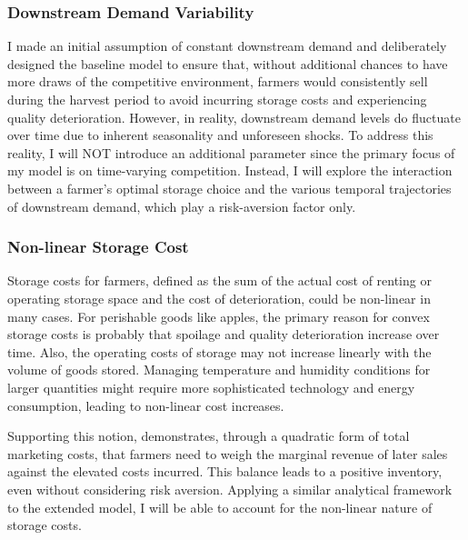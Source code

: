 \subsubsection{Downstream Demand Variability}
\noindent I made an initial assumption of constant downstream demand and deliberately designed the baseline model to ensure that, without additional chances to have more draws of the competitive environment, farmers would consistently sell during the harvest period to avoid incurring storage costs and experiencing quality deterioration. However, in reality, downstream demand levels do fluctuate over time due to inherent seasonality and unforeseen shocks. To address this reality, I will NOT introduce an additional parameter since the primary focus of my model is on time-varying competition. Instead, I will explore the interaction between a farmer's optimal storage choice and the various temporal trajectories of downstream demand, which play a risk-aversion factor only.



\subsubsection{Non-linear Storage Cost}
\noindent Storage costs for farmers, defined as the sum of the actual cost of renting or operating storage space and the cost of deterioration, could be non-linear in many cases. For perishable goods like apples, the primary reason for convex storage costs is probably that spoilage and quality deterioration increase over time. Also, the operating costs of storage may not increase linearly with the volume of goods stored. Managing temperature and humidity conditions for larger quantities might require more sophisticated technology and energy consumption, leading to non-linear cost increases.

Supporting this notion, \cite{williams1989economic} demonstrates, through a quadratic form of total marketing costs, that farmers need to weigh the marginal revenue of later sales against the elevated costs incurred. This balance leads to a positive inventory, even without considering risk aversion. Applying a similar analytical framework to the extended model, I will be able to account for the non-linear nature of storage costs.



